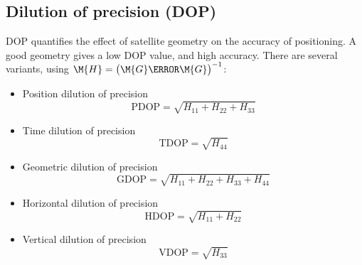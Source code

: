 \subsection{Dilution of precision (DOP)}
DOP quantifies the effect of satellite geometry on the accuracy of positioning. A good geometry gives a low DOP value, and high accuracy. There are several variants, using $\M{H} = \left( \M{G}\T \M{G} \right)^{-1}$:
\begin{itemize}
    \item
        Position dilution of precision
        \begin{equation}
            \mathrm{PDOP} = \sqrt{H_{11} + H_{22} + H_{33}}
        \end{equation}
    \item
        Time dilution of precision
        \begin{equation}
            \mathrm{TDOP} = \sqrt{H_{44}}
        \end{equation}
    \item
        Geometric dilution of precision
        \begin{equation}
            \mathrm{GDOP} = \sqrt{H_{11} + H_{22} + H_{33} + H_{44}}
        \end{equation}
    \item
        Horizontal dilution of precision
        \begin{equation}
            \mathrm{HDOP} = \sqrt{H_{11} + H_{22}}
        \end{equation}
    \item
        Vertical dilution of precision
        \begin{equation}
            \mathrm{VDOP} = \sqrt{H_{33}}
        \end{equation}
\end{itemize}
